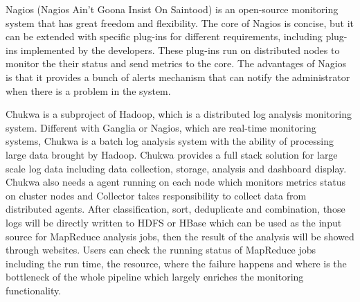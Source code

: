 Nagios (Nagios Ain’t Goona Insist On Saintood) \cite{josephsen2007building} is an open-source monitoring system that has great freedom and flexibility. 
The core of Nagios is concise, but it can be extended with specific plug-ins for different requirements, including plug-ins implemented by the developers.
These plug-ins run on distributed nodes to monitor the their status and send metrics to the core. 
The advantages of Nagios is that it provides a bunch of alerts mechanism that can notify the administrator when there is a problem in the system.
\par
Chukwa\cite{boulon2008chukwa} is a subproject of Hadoop, which is a distributed log analysis monitoring system. 
Different with Ganglia or Nagios, which are real-time monitoring systems, Chukwa is a batch log analysis system with the ability of processing large data brought by Hadoop.
Chukwa provides a full stack solution for large scale log data including data collection, storage, analysis and dashboard display.
Chukwa also needs a agent running on each node which monitors metrics status on cluster nodes and Collector takes responsibility to collect data from distributed agents. After classification, sort, deduplicate and combination, those logs will be directly written to HDFS or HBase which can be used as the input source for MapReduce analysis jobs, then the result of the analysis will be showed through websites. Users can check the running status of MapReduce jobs including the run time, the resource, where the failure happens and where is the bottleneck of the whole pipeline which largely enriches the monitoring functionality.


